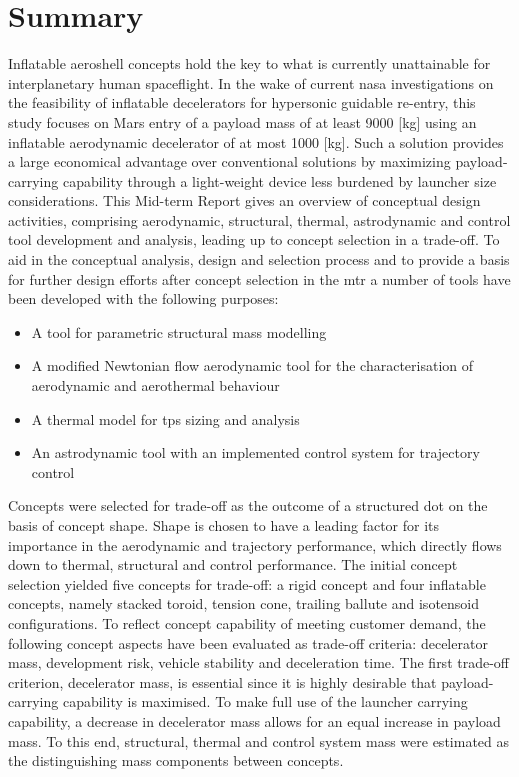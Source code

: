 \section*{Summary}\label{cha:summary}


Inflatable aeroshell concepts hold the key to what is currently unattainable for interplanetary human spaceflight. In the wake of current \acrfull{nasa} investigations on the feasibility of inflatable decelerators for hypersonic guidable re-entry, this study focuses on Mars entry of a payload mass of at least 9000 [kg] using an inflatable aerodynamic decelerator of at most 1000 [kg]. Such a solution provides a large economical advantage over conventional solutions by maximizing payload-carrying capability through a light-weight device less burdened by launcher size considerations. This Mid-term Report gives an overview of conceptual design activities, comprising aerodynamic, structural, thermal, astrodynamic and control tool development and analysis, leading up to concept selection in a trade-off.
\newline
\newline
To aid in the conceptual analysis, design and selection process and to provide a basis for further design efforts after concept selection in the \acrfull{mtr} a number of tools have been developed with the following purposes:
\begin{itemize}
\item A tool for parametric structural mass modelling
\item A modified Newtonian flow aerodynamic tool for the characterisation of aerodynamic and aerothermal behaviour
\item A thermal model for \acrfull{tps} sizing and analysis
\item An astrodynamic tool with an implemented control system for trajectory control
\end{itemize}

Concepts were selected for trade-off as the outcome of a structured \acrfull{dot} on the basis of concept shape. Shape is chosen to have a leading factor for its importance in the aerodynamic and trajectory performance, which directly flows down to thermal, structural and control performance. The initial concept selection yielded five concepts for trade-off: a rigid concept and four inflatable concepts, namely stacked toroid, tension cone, trailing ballute and isotensoid configurations. To reflect concept capability of meeting customer demand, the following concept aspects have been evaluated as trade-off criteria: decelerator mass, development risk, vehicle stability and deceleration time.
\newline
\newline
The first trade-off criterion, decelerator mass, is essential since it is highly desirable that payload-carrying capability is maximised. To make full use of the launcher carrying capability, a decrease in decelerator mass allows for an equal increase in payload mass. To this end, structural, thermal and control system mass were estimated as the distinguishing mass components between concepts. 

